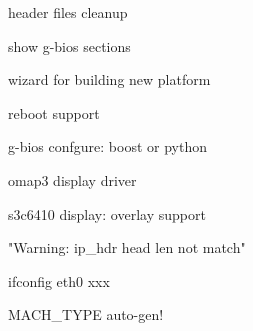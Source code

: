 header files cleanup

show g-bios sections

wizard for building new platform

reboot support

g-bios confgure: boost or python

omap3 display driver

s3c6410 display: overlay support

"Warning: ip_hdr head len not match"

ifconfig eth0 xxx

MACH_TYPE auto-gen!


